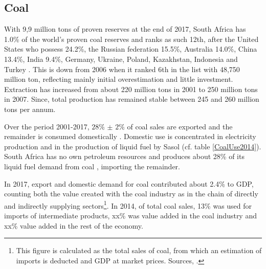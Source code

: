 \documentclass[12pt,english]{article}
\begin{document}
\subsection{Coal}

With 9,9 million tons of proven reserves at the end of 2017, South Africa has 1.0\% of the world's proven coal reserves and ranks as such 12th, after the United States who possess 24.2\%, the Russian federation 15.5\%, Australia 14.0\%, China 13.4\%, India 9.4\%, Germany, Ukraine, Poland, Kazakhstan, Indonesia and Turkey . %
This is down from 2006 when it ranked 6th in the list with 48,750 million ton, reflecting mainly initial overestimation and little investment. Extraction has increased from about 220 million tons in 2001 to 250 million tons in 2007. Since, total production has remained stable between 245 and 260 million tons per annum.  %

Over the period 2001-2017, $28\%$ $\pm$ $2\%$ of coal sales are exported and the remainder is consumed domestically . Domestic use is concentrated in electricity production and in the production of liquid fuel by Sasol (cf. table \ref{CoalUse2014}). South Africa has no own petroleum resources and produces about 28\% of its liquid fuel demand from coal \citep{coal2013DoE}, importing the remainder.

In 2017, export and domestic demand for coal contributed about 2.4\% to GDP, counting both the value created with the coal industry as in the chain of directly and indirectly supplying sectors\footnote{This figure is calculated as the total sales of coal, from which an estimation of imports is deducted and GDP at market prices. Sources, .}. In 2014, of total coal sales, 13\% was used for imports of intermediate products, xx\% was value added in the coal industry and xx\% value added in the rest of the economy.

\end{document}
